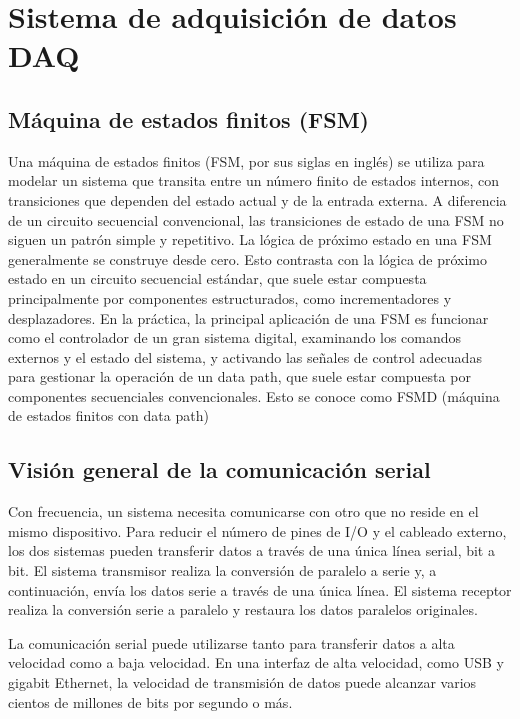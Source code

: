 \chapter{Sistema de adquisición de datos DAQ}

  \section{Máquina de estados finitos (FSM)}

  Una máquina de estados finitos (FSM, por sus siglas en inglés) se utiliza para modelar un sistema que transita entre un número finito de estados internos, con transiciones que dependen del estado actual y de la entrada externa. A diferencia de un circuito secuencial convencional, las transiciones de estado de una FSM no siguen un patrón simple y repetitivo. La lógica de próximo estado en una FSM generalmente se construye desde cero. Esto contrasta con la lógica de próximo estado en un circuito secuencial estándar, que suele estar compuesta principalmente por componentes estructurados, como incrementadores y desplazadores. En la práctica, la principal aplicación de una FSM es funcionar como el controlador de un gran sistema digital, examinando los comandos externos y el estado del sistema, y activando las señales de control adecuadas para gestionar la operación de un data path, que suele estar compuesta por componentes secuenciales convencionales. Esto se conoce como FSMD (máquina de estados finitos con data path)

  \section{Visión general de la comunicación serial}

    Con frecuencia, un sistema necesita comunicarse con otro que no reside en el mismo dispositivo. Para reducir el número de pines de I/O y el cableado externo, los dos sistemas pueden transferir datos a través de una única línea serial, bit a bit. El sistema transmisor realiza la conversión de paralelo a serie y, a continuación, envía los datos serie a través de una única línea. El sistema receptor realiza la conversión serie a paralelo y restaura los datos paralelos originales.

    La comunicación serial puede utilizarse tanto para transferir datos a alta velocidad como a baja velocidad. En una interfaz de alta velocidad, como USB y gigabit Ethernet, la velocidad de transmisión de datos puede alcanzar varios cientos de millones de bits por segundo o más. 

